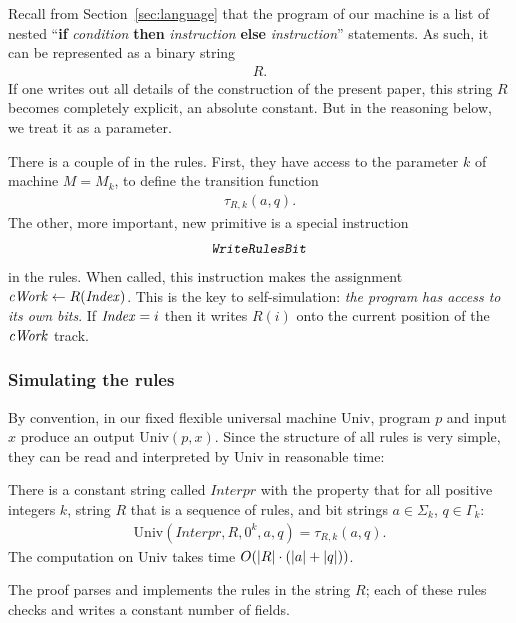\documentclass[12pt]{memoir}
\newcommand{\fld}[1]{\ensuremath{\textit{#1\/}}}
\newcommand{\rul}[1]{\ensuremath{\texttt{\slshape #1\/}}}
\newcommand{\Index}{\fld{Index}}
\newcommand{\cWork}{\fld{cWork}}
\newcommand{\Interpr}{\mathit{Interpr}}
\newcommand{\Un}{\mathrm{Univ}}
\newcommand{\WriteRulesBit}{\rul{WriteRulesBit}}
\begin{document}
Recall from Section~\ref{sec:language} that the program
of our machine is a list of nested
``\textbf{if} \emph{condition} \textbf{then} \emph{instruction}
\textbf{else} \emph{instruction}''
statements.
As such, it can be represented as a binary string 
 \begin{align*}
   R.
 \end{align*}
If one writes out all details of the construction of the present paper, this string \( R \)
becomes completely explicit, an absolute constant.
But in the reasoning below, we treat it as a parameter.

There is a couple of  in the rules.
First, they have access to the parameter \( k \) of machine \( M=M_{k} \), 
to define the transition function
 \begin{align*}
            \tau_{R,k}(a,q).
 \end{align*}
The other, more important, new primitive is a special instruction
 \begin{align*}
   \WriteRulesBit
 \end{align*}
in the rules.
When called, this instruction makes the assignment \( \cWork\gets R(\Index) \).
This is the key to self-simulation: \emph{the program has
access to its own bits}.
If \( \Index=i \) then it writes \( R(i) \) onto the current position of the \( \cWork \) track.


\subsubsection{Simulating the rules}

By convention, in our fixed flexible universal machine \( \Un \),
program \( p \) and input \( x \) produce an output \( \Un(p,x) \).
Since the structure of all rules is very simple, they can be read and
interpreted by \( \Un \) in reasonable time:

\begin{theorem}
There is a constant string called \( \Interpr \) with the property that for
all positive integers \( k \), string \( R \) that is a
sequence of rules, and bit strings \( a\in\Sigma_{k} \), \( q\in \Gamma_{k} \):
 \begin{align*}
  \Un(\Interpr,R,0^{k},a,q)=\tau_{R,k}(a,q).
 \end{align*}
The computation on \( \Un \) takes time \( O(\lvert R \rvert\cdot (\lvert a \rvert+\lvert q \rvert)) \).
\end{theorem}

The proof parses and implements the rules in the string \( R \); each of these rules
checks and writes a constant number of fields.
\end{document}
